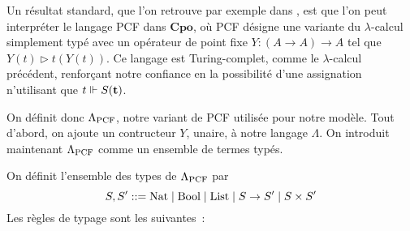 \documentclass{article}
\begin{document}
Un résultat standard, que l'on retrouve par exemple dans \cite{Amadio_Curien_1998}, est que l'on peut interpréter le langage PCF dans $\mathbf{Cpo}$, où PCF désigne une variante du $\lambda$-calcul simplement typé avec un opérateur de point fixe $Y : (A \to A) \to A$ tel que $Y(t) \rhd t(Y(t))$. Ce langage est Turing-complet, comme le $\lambda$-calcul précédent, renforçant notre confiance en la possibilité d'une assignation n'utilisant que $t\reali S(\bt)$.

On définit donc $\LamP$, notre variant de PCF utilisée pour notre modèle. Tout d'abord, on ajoute un contructeur $Y$, unaire, à notre langage $\Lambda$. On introduit maintenant $\LamP$ comme un ensemble de termes typés.

\begin{defi}[$\LamP$]
  On définit l'ensemble des types de $\LamP$ par
  \[S,S' ::= \Nat\mid\Bool\mid\List\mid S \to S' \mid S \times S'\]
  Les règles de typage sont les suivantes~:
  \begin{center}
    \begin{prooftree}
    \end{prooftree}
    \quad
    \begin{prooftree}
    \end{prooftree}
    \quad
    \begin{prooftree}
    \end{prooftree}

    \vspace{0.5cm}

    \begin{prooftree}
    \end{prooftree}
    \quad
    \begin{prooftree}
    \end{prooftree}
    \quad
    \begin{prooftree}
    \end{prooftree}

    \vspace{0.5cm}


\end{center}
\end{defi}
\end{document}
